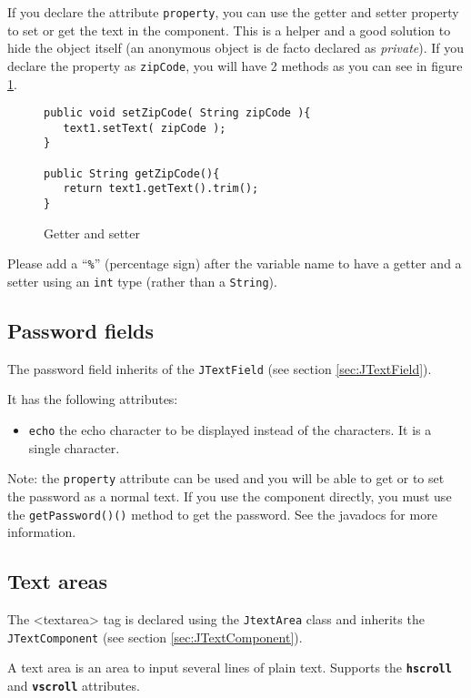 \documentclass[a4paper,onecolumn,10pt]{book}
\newcommand{\jmethod}[1]{\texttt{\small #1()}}
\newcommand{\jclass}[1]{\texttt{\small #1}}
\newcommand{\tag}[1]{\textsf{<#1>}}
\newcommand{\attr}[1]{\texttt{\small \textbf{#1}}}
\begin{document}
If you declare the attribute \verb|property|, you can use the
getter and setter property to set or get the text in the component. This
is a helper and a good solution to hide the object itself (an anonymous
object is de facto declared as \emph{private}). If you declare the
property as \verb|zipCode|, you will have 2 methods as you can see in
figure \ref{fig:getset}.


\begin{figure}[htb]
\begin{lstlisting}
public void setZipCode( String zipCode ){
   text1.setText( zipCode );
}

public String getZipCode(){
   return text1.getText().trim();
}
\end{lstlisting}
\caption{Getter and setter}\label{fig:getset}
\end{figure}


Please add a ``\verb|%|'' (percentage sign) after the variable name to
have a getter and a setter using an \jclass{int} type (rather than a
\jclass{String}).


\subsection{\label{sec:JPasswordField}Password fields}
The password field inherits of the \jclass{JTextField} (see section
\ref{sec:JTextField}).

It has the following attributes:
\begin{itemize}
  \item \verb|echo| the echo character to be displayed instead of
			the characters. It is a single character.
\end{itemize}

 
Note: the \verb|property| attribute can be used and you will be able
to get or to set the password as a normal text. If you use the component
directly, you must use the \jmethod{getPassword()} method to get
the password. See the javadocs for more information.

 
\subsection{\label{sec:JTextArea}Text areas}
The \tag{textarea} tag is declared using the \jclass{JtextArea} class and inherits the
\jclass{JTextComponent} (see section \ref{sec:JTextComponent}).
 
A text area is an area to input several lines of plain text. Supports the
\attr{hscroll} and \attr{vscroll} attributes.
\end{document}
